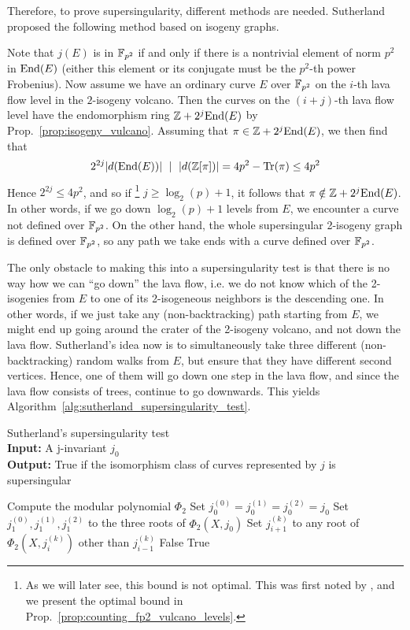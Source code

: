 Therefore, to prove supersingularity, different methods are needed.
Sutherland \cite{sutherland_supersingularity_test} proposed the following method based on isogeny graphs.

Note that $j(E)$ is in $\mathbb{F}_{p^2}$ if and only if there is a nontrivial element of norm $p^2$ in $\mathrm{End}(E)$ (either this element or its conjugate must be the $p^2$-th power Frobenius).
Now assume we have an ordinary curve $E$ over $\mathbb{F}_{p^2}$ on the $i$-th lava flow level in the $2$-isogeny volcano.
Then the curves on the $(i + j)$-th lava flow level have the endomorphism ring $\mathbb{Z} + 2^j\mathrm{End}(E)$ by Prop.~\ref{prop:isogeny_vulcano}.
Assuming that $\pi \in \mathbb{Z} + 2^j\mathrm{End}(E)$, we then find that
\begin{equation*}
    2^{2j} |d(\mathrm{End}(E))| \ \mid \  |d(\mathbb{Z}[\pi])| = 4p^2 - \mathrm{Tr}(\pi) \leq 4p^2
\end{equation*}
Hence $2^{2j} \leq 4p^2$, and so if
\footnote{As we will later see, this bound is not optimal. This was first noted by \cite{fp_supersingularity_tests}, and we present the optimal bound in Prop.~\ref{prop:counting_fp2_vulcano_levels}.}
$j \geq \log_2(p) + 1$, it follows that $\pi \notin \mathbb{Z} + 2^j\mathrm{End}(E)$.
In other words, if we go down $\log_2(p) + 1$ levels from $E$, we encounter a curve not defined over $\mathbb{F}_{p^2}$.
On the other hand, the whole supersingular 2-isogeny graph is defined over $\mathbb{F}_{p^2}$, so any path we take ends with a curve defined over $\mathbb{F}_{p^2}$.

The only obstacle to making this into a supersingularity test is that there is no way how we can ``go down'' the lava flow, i.e. we do not know which of the 2-isogenies from $E$ to one of its 2-isogeneous neighbors is the descending one.
In other words, if we just take any (non-backtracking) path starting from $E$, we might end up going around the crater of the 2-isogeny volcano, and not down the lava flow.
Sutherland's idea now is to simultaneously take three different (non-backtracking) random walks from $E$, but ensure that they have different second vertices.
Hence, one of them will go down one step in the lava flow, and since the lava flow consists of trees, continue to go downwards.
This yields Algorithm~\ref{alg:sutherland_supersingularity_test}.
\begin{algorithm}
\caption{\label{alg:sutherland_supersingularity_test} Sutherland's supersingularity test\\
\textbf{Input:} A j-invariant $j_0$\\
\textbf{Output:} True if the isomorphism class of curves represented by $j$ is supersingular}
\begin{algorithmic}[1]
\State Compute the modular polynomial $\Phi_2$
\State Set $j_0^{(0)} = j_0^{(1)} = j_0^{(2)} = j_0$
\State Set $j_1^{(0)}, j_1^{(1)}, j_1^{(2)}$ to the three roots of $\Phi_2(X, j_0)$
        \State Set $j_{i + 1}^{(k)}$ to any root of $\Phi_2(X, j_i^{(k)})$ other than $j_{i - 1}^{(k)}$
            \Return False
        \EndIf
    \EndFor
\EndFor
\State \Return True
\end{algorithmic}
\end{algorithm}

